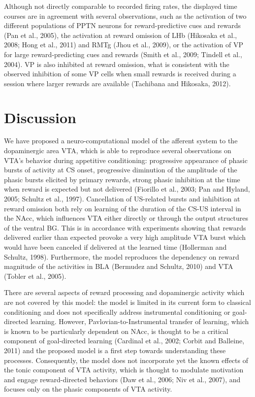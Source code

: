 \documentclass[
  11pt,
  a4paper,
]{scrbook}
\begin{document}
Although not directly comparable to recorded firing rates, the displayed
time courses are in agreement with several observations, such as the
activation of two different populations of PPTN neurons for
reward-predictive cues and rewards (Pan et al., 2005), the activation at
reward omission of LHb (Hikosaka et al., 2008; Hong et al., 2011) and
RMTg (Jhou et al., 2009), or the activation of VP for large
reward-predicting cues and rewards (Smith et al., 2009; Tindell et al.,
2004). VP is also inhibited at reward omission, what is consistent with
the observed inhibition of some VP cells when small rewards is received
during a session where larger rewards are available (Tachibana and
Hikosaka, 2012).

\section{Discussion}\label{discussion-2}

We have proposed a neuro-computational model of the afferent system to
the dopaminergic area VTA, which is able to reproduce several
observations on VTA's behavior during appetitive conditioning:
progressive appearance of phasic bursts of activity at CS onset,
progressive diminution of the amplitude of the phasic bursts elicited by
primary rewards, strong phasic inhibition at the time when reward is
expected but not delivered (Fiorillo et al., 2003; Pan and Hyland, 2005;
Schultz et al., 1997). Cancellation of US-related bursts and inhibition
at reward omission both rely on learning of the duration of the CS-US
interval in the NAcc, which influences VTA either directly or through
the output structures of the ventral BG. This is in accordance with
experiments showing that rewards delivered earlier than expected provoke
a very high amplitude VTA burst which would have been canceled if
delivered at the learned time (Hollerman and Schultz, 1998).
Furthermore, the model reproduces the dependency on reward magnitude of
the activities in BLA (Bermudez and Schultz, 2010) and VTA (Tobler et
al., 2005).

There are several aspects of reward processing and dopaminergic activity
which are not covered by this model: the model is limited in its current
form to classical conditioning and does not specifically address
instrumental conditioning or goal-directed learning. However,
Pavlovian-to-Instrumental transfer of learning, which is known to be
particularly dependent on NAcc, is thought to be a critical component of
goal-directed learning (Cardinal et al., 2002; Corbit and Balleine,
2011) and the proposed model is a first step towards understanding these
processes. Consequently, the model does not incorporate yet the known
effects of the tonic component of VTA activity, which is thought to
modulate motivation and engage reward-directed behaviors (Daw et al.,
2006; Niv et al., 2007), and focuses only on the phasic components of
VTA activity.
\end{document}
